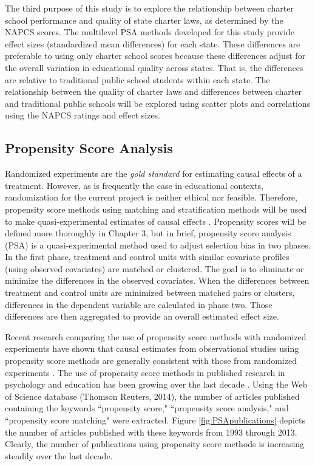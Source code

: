 \documentclass[letterpaper,12p,twoside]{article} %
\begin{document}
The third purpose of this study is to explore the relationship between charter school performance and quality of state charter laws, as determined by the NAPCS scores. The multilevel PSA methods developed for this study provide effect sizes (standardized mean differences) for each state. These differences are preferable to using only charter school scores because these differences adjust for the overall variation in educational quality across states. That is, the differences are relative to traditional public school students within each state. The relationship between the quality of charter laws and differences between charter and traditional public schools will be explored using scatter plots and correlations using the NAPCS ratings and effect sizes.

\subsection{Propensity Score Analysis}

Randomized experiments are the \textit{gold standard} for estimating causal effects of a treatment. However, as is frequently the case in educational contexts, randomization for the current project is neither ethical nor feasible. Therefore, propensity score methods \cite{RosenbaumRubin1983} using matching \cite{StuartRubin2008,Stuart2010} and stratification methods \cite{RaudenbushHongRowan2003} will be used to make quasi-experimental estimates of causal effects \cite<see also>{SchneiderEtAl2007,StuartRubin2008}. Propensity scores will be defined more thoroughly in Chapter 3, but in brief, propensity score analysis (PSA) is a quasi-experimental method used to adjust selection bias in two phases. In the first phase, treatment and control units with similar covariate profiles (using observed covariates) are matched or clustered. The goal is to eliminate or minimize the differences in the observed covariates. When the differences between treatment and control units are minimized between matched pairs or clusters, differences in the dependent variable are calculated in phase two. Those differences are then aggregated to provide an overall estimated effect size.

Recent research comparing the use of propensity score methods with randomized experiments have shown that causal estimates from observational studies using propensity score methods are generally consistent with those from randomized experiments \cite{CookShadishWong2008,ShadishClarkSteiner2008}. The use of propensity score methods in published research in psychology and education has been growing over the last decade \cite{ThoemmesKim2011}. Using the Web of Science database (Thomson Reuters, 2014), the number of articles published containing the keywords ``propensity score," ``propensity score analysis," and ``propensity score matching" were extracted. Figure \ref{fig:PSApublications} depicts the number of articles published with these keywords from 1993 through 2013. Clearly, the number of publications using propensity score methods is increasing steadily over the last decade.
\end{document}
